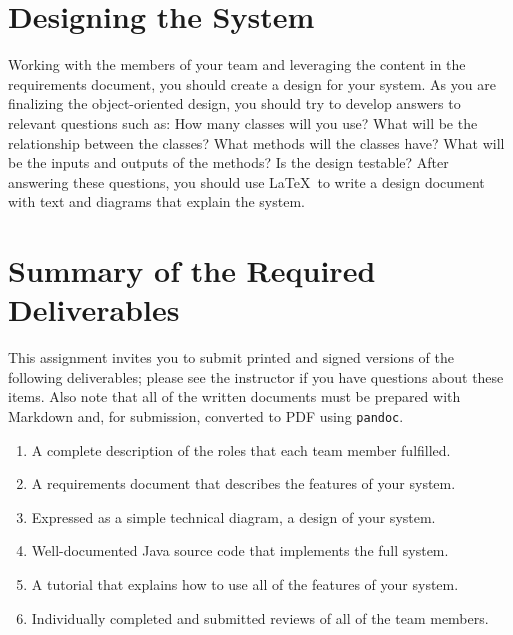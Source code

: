 \section*{Designing the System}

Working with the members of your team and leveraging the content in the requirements document, you should create a
design for your system.  As you are finalizing the object-oriented design, you should try to develop answers to relevant
questions such as: How many classes will you use? What will be the relationship between the classes? What methods will
the classes have? What will be the inputs and outputs of the methods?  Is the design testable?  After answering these
questions, you should use \LaTeX\  to write a design document with text and diagrams that explain the system.

\section*{Summary of the Required Deliverables}

This assignment invites you to submit printed and signed versions of the following deliverables; please see the
instructor if you have questions about these items. Also note that all of the written documents must be prepared with
Markdown and, for submission, converted to PDF using {\tt pandoc}.

\vspace*{-.1in}
\begin{enumerate}
  \setlength{\itemsep}{0in}
  \item A complete description of the roles that each team member fulfilled.
  \item A requirements document that describes the features of your system.
  \item Expressed as a simple technical diagram, a design of your system.
  \item Well-documented Java source code that implements the full system.
  \item A tutorial that explains how to use all of the features of your system.
  \item Individually completed and submitted reviews of all of the team members.
\end{enumerate}
\vspace*{-.1in}


